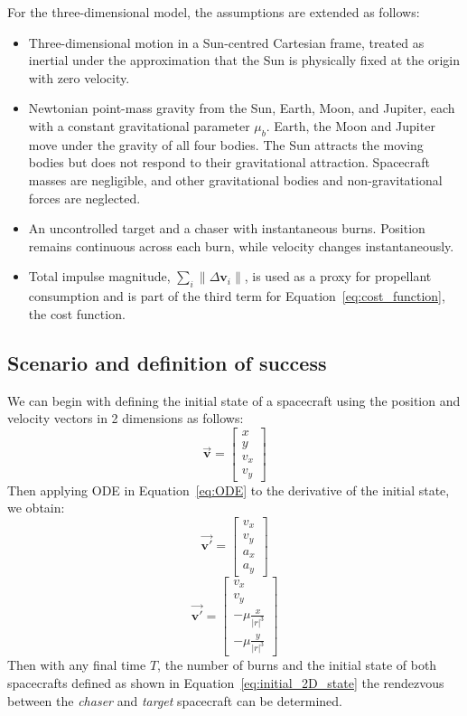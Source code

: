 \documentclass[11pt,letterpaper]{article}
\newcommand{\abs}[1]{\left\lvert#1\right\rvert}
\begin{document}
For the three-dimensional model, the assumptions are extended as follows:
\begin{itemize}
  \item Three-dimensional motion in a Sun-centred Cartesian frame, treated
        as inertial under the approximation that the Sun is physically
        fixed at the origin with zero velocity.
  \item Newtonian point-mass gravity from the Sun, Earth, Moon, and Jupiter,
        each with a constant gravitational parameter $\mu_b$.
        Earth, the Moon and Jupiter move under the gravity of all four bodies.
        The Sun attracts the moving bodies but does not respond to their
        gravitational attraction.
        Spacecraft masses are negligible, and other gravitational bodies
        and non-gravitational forces are neglected.
  \item An uncontrolled target and a chaser with instantaneous burns.
        Position remains continuous across each burn, while velocity
        changes instantaneously.
  \item Total impulse magnitude,
        $\sum_i \|\Delta\mathbf v_i\|$,
        is used as a proxy for propellant consumption and is part of the third term for Equation~\ref{eq:cost_function}, the cost function.
\end{itemize}
\subsection{Scenario and definition of success}
We can begin with defining the initial state of a spacecraft using the position and velocity vectors in 2 dimensions as follows:
\begin{equation}
  \mathbf{\vec{v}}=\begin{bmatrix} x \\ y \\ v_x \\ v_y \end{bmatrix}
  \label{eq:initial_2D_state}
\end{equation}
Then applying ODE in Equation~\ref{eq:ODE} to the derivative of the initial state, we obtain:
\begin{equation}
  \mathbf{\vec{v'}}=\begin{bmatrix} v_x \\ v_y \\ a_x \\ a_y \end{bmatrix}
  \label{eq:initial_2D_state_derivative}
\end{equation}
\begin{equation}
  \mathbf{\vec{v'}}=\begin{bmatrix} v_x \\ v_y \\ -\mu\frac{x}{\abs{r}^3} \\ -\mu\frac{y}{\abs{r}^3} \end{bmatrix}
  \label{eq:initial_2D_state_derivative_ODE}
\end{equation}
Then with any final time $T$, the number of burns and the initial state of both spacecrafts defined as shown in Equation~\ref{eq:initial_2D_state}
the rendezvous between the \textit{chaser} and \textit{target} spacecraft can be determined.
\end{document}
